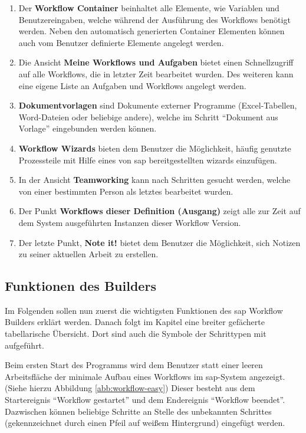 \begin{enumerate}
	\item Der \textbf{Workflow Container} beinhaltet alle Elemente, wie Variablen und Benutzereingaben, welche während der Ausführung des Workflows benötigt werden. Neben den automatisch generierten Container Elementen können auch vom Benutzer definierte Elemente angelegt werden.
	\item Die Ansicht \textbf{Meine Workflows und Aufgaben} bietet einen Schnellzugriff auf alle Workflows, die in letzter Zeit bearbeitet wurden. Des weiteren kann eine eigene Liste an Aufgaben und Workflows angelegt werden.
	\item \textbf{Dokumentvorlagen} sind Dokumente externer Programme (Excel-Tabellen, Word-Dateien oder beliebige andere), welche im Schritt "`Dokument aus Vorlage"' eingebunden werden können. 
	\item \textbf{Workflow Wizards} bieten dem Benutzer die Möglichkeit, häufig genutzte Prozessteile mit Hilfe eines von \gls{sap} bereitgestellten \gls{wizard}s einzufügen.
	\item In der Ansicht \textbf{Teamworking} kann nach Schritten gesucht werden, welche von einer bestimmten Person als letztes bearbeitet wurden.
	\item Der Punkt \textbf{Workflows dieser Definition (Ausgang)} zeigt alle zur Zeit auf dem System ausgeführten Instanzen dieser Workflow Version.
	\item Der letzte Punkt, \textbf{Note it!} bietet dem Benutzer die Möglichkeit, sich Notizen zu seiner aktuellen Arbeit zu erstellen.
\end{enumerate}



\subsection{Funktionen des Builders}
\label{sec:builder-funktionen}
Im Folgenden sollen nun zuerst die wichtigsten Funktionen des \gls{sap} Workflow Builders erklärt werden. Danach folgt im Kapitel  eine breiter gefächerte tabellarische Übersicht. Dort sind auch die Symbole der Schrittypen mit aufgeführt. 

Beim ersten Start des Programms wird dem Benutzer statt einer leeren Arbeitsfläche der minimale Aufbau eines Workflows im \gls{sap}-System angezeigt. (Siehe hierzu Abbildung \ref{abb:workflow-easy}) Dieser besteht aus dem Startereignis "`Workflow gestartet"' und dem Endereignis "`Workflow beendet"'. Dazwischen können beliebige Schritte an Stelle des unbekannten Schrittes (gekennzeichnet durch einen Pfeil auf weißem Hintergrund) eingefügt werden.

